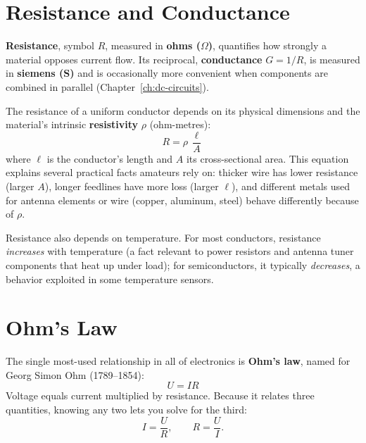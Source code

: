 \section{Resistance and Conductance}

\textbf{Resistance}, symbol $R$, measured in \textbf{ohms ($\Omega$)},
quantifies how strongly a material opposes current flow. Its reciprocal,
\textbf{conductance} $G = 1/R$, is measured in \textbf{siemens (S)} and is
occasionally more convenient when components are combined in parallel
(Chapter~\ref{ch:dc-circuits}).

The resistance of a uniform conductor depends on its physical dimensions
and the material's intrinsic \textbf{resistivity} $\rho$ (ohm-metres):
\[
R = \rho\,\frac{\ell}{A}
\]
where $\ell$ is the conductor's length and $A$ its cross-sectional area.
This equation explains several practical facts amateurs rely on: thicker
wire has lower resistance (larger $A$), longer feedlines have more loss
(larger $\ell$), and different metals used for antenna elements or wire
(copper, aluminum, steel) behave differently because of $\rho$.

Resistance also depends on temperature. For most conductors, resistance
\emph{increases} with temperature (a fact relevant to power resistors and
antenna tuner components that heat up under load); for semiconductors, it
typically \emph{decreases}, a behavior exploited in some temperature
sensors.

\section{Ohm's Law}
\label{sec:ohms-law}

The single most-used relationship in all of electronics is \textbf{Ohm's
law}, named for Georg Simon Ohm (1789--1854):
\[
\boxed{U = IR}
\]
Voltage equals current multiplied by resistance. Because it relates three
quantities, knowing any two lets you solve for the third:
\[
I = \frac{U}{R}, \qquad R = \frac{U}{I}.
\]

\begin{center}
\end{center}

